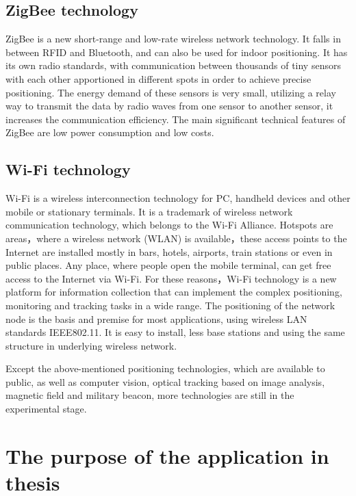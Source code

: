 \subsection{ZigBee technology}

ZigBee is a new short-range and low-rate wireless network technology. It falls in between RFID and Bluetooth, and can also be used for indoor positioning. It has its own radio standards, with communication between thousands of tiny sensors with each other apportioned in different spots in order to achieve precise positioning. The energy demand of these sensors is very small, utilizing a relay way to transmit the data by radio waves from one sensor to another sensor, it increases the communication efficiency. The main significant technical features of ZigBee are low power consumption and low costs.    

\subsection{Wi-Fi technology}

Wi-Fi is a wireless interconnection technology for PC, handheld devices and other mobile or stationary terminals. It is a trademark of wireless network communication technology, which belongs to the Wi-Fi Alliance. Hotspots are areas，where a wireless network (WLAN) is available，these access points to the Internet are installed mostly in bars, hotels, airports, train stations or even in public places. Any place, where people open the mobile terminal, can get free access to the Internet via Wi-Fi. For these reasons，Wi-Fi technology is a new platform for information collection that can implement the complex positioning, monitoring and tracking tasks in a wide range. The positioning of the network node is the basis and premise for most applications, using wireless LAN standards IEEE802.11. It is easy to install, less base stations and using the same structure in underlying wireless network.    

Except the above-mentioned positioning technologies, which are available to public, as well as computer vision, optical tracking based on image analysis, magnetic field and military beacon, more technologies are still in the experimental stage.    

\section{The purpose of the application in thesis}

